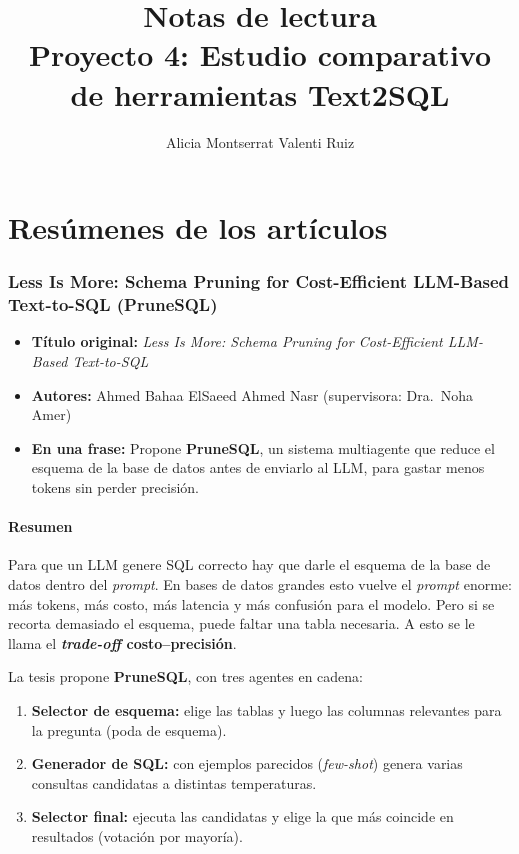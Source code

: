 \documentclass[11pt,a4paper]{article}
\title{Notas de lectura\\[4pt]
  \large Proyecto 4: Estudio comparativo de herramientas Text2SQL}
\author{Alicia Montserrat Valenti Ruiz}
\newcommand{\ficha}[5]{%
  \begin{itemize}[leftmargin=*, label={}]
    \item \textbf{Título original:} \textit{#1}
    \item \textbf{Autores:} #2
    \item \textbf{En una frase:} #5
  \end{itemize}
}
\begin{document}
\maketitle
\tableofcontents
\newpage

\part{Resúmenes de los artículos}

\section{Less Is More: Schema Pruning for Cost-Efficient LLM-Based Text-to-SQL (PruneSQL)}
\ficha
  {Less Is More: Schema Pruning for Cost-Efficient LLM-Based Text-to-SQL}
  {Ahmed Bahaa ElSaeed Ahmed Nasr (supervisora: Dra.\ Noha Amer)}
  {German University in Cairo}
  {Tesis de maestría en Informática Empresarial, 2026}
  {Propone \textbf{PruneSQL}, un sistema multiagente que reduce el esquema de la base de datos antes de enviarlo al LLM, para gastar menos tokens sin perder precisión.}

\subsection*{Resumen}
Para que un LLM genere SQL correcto hay que darle el esquema de la base de datos dentro del \textit{prompt}. En bases de datos grandes esto vuelve el \textit{prompt} enorme: más tokens, más costo, más latencia y más confusión para el modelo. Pero si se recorta demasiado el esquema, puede faltar una tabla necesaria. A esto se le llama el \textbf{\textit{trade-off} costo--precisión}.

La tesis propone \textbf{PruneSQL}, con tres agentes en cadena:
\begin{enumerate}
  \item \textbf{Selector de esquema:} elige las tablas y luego las columnas relevantes para la pregunta (poda de esquema).
  \item \textbf{Generador de SQL:} con ejemplos parecidos (\textit{few-shot}) genera varias consultas candidatas a distintas temperaturas.
  \item \textbf{Selector final:} ejecuta las candidatas y elige la que más coincide en resultados (votación por mayoría).
\end{enumerate}
\end{document}
